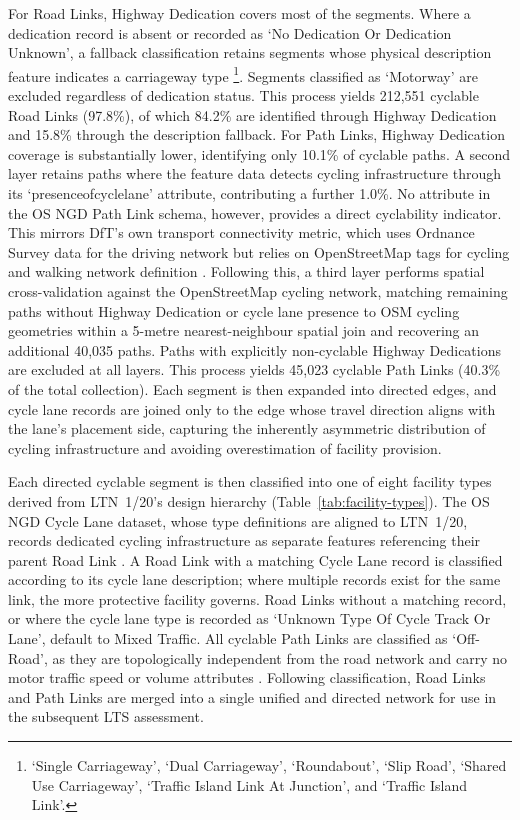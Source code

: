 For Road Links, Highway Dedication covers most of the segments. Where a dedication record is absent or recorded as `No Dedication Or Dedication Unknown', a fallback classification retains segments whose physical description feature indicates a carriageway type \footnote{`Single Carriageway', `Dual Carriageway', `Roundabout', `Slip Road', `Shared Use Carriageway', `Traffic Island Link At Junction', and `Traffic Island Link'.}. Segments classified as `Motorway' are excluded regardless of dedication status. This process yields 212,551 cyclable Road Links (97.8\%), of which 84.2\% are identified through Highway Dedication and 15.8\% through the description fallback. For Path Links, Highway Dedication coverage is substantially lower, identifying only 10.1\% of cyclable paths. A second layer retains paths where the feature data detects cycling infrastructure through its `presenceofcyclelane' attribute, contributing a further 1.0\%. No attribute in the OS NGD Path Link schema, however, provides a direct cyclability indicator. This mirrors DfT’s own transport connectivity metric, which uses Ordnance Survey data for the driving network but relies on OpenStreetMap tags for cycling and walking network definition \parencite{dft2025}. Following this, a third layer performs spatial cross-validation against the OpenStreetMap cycling network, matching remaining paths without Highway Dedication or cycle lane presence to OSM cycling geometries within a 5-metre nearest-neighbour spatial join and recovering an additional 40,035 paths. Paths with explicitly non-cyclable Highway Dedications are excluded at all layers. This process yields 45,023 cyclable Path Links (40.3\% of the total collection). Each segment is then expanded into directed edges, and cycle lane records are joined only to the edge whose travel direction aligns with the lane's placement side, capturing the inherently asymmetric distribution of cycling infrastructure and avoiding overestimation of facility provision.
 
Each directed cyclable segment is then classified into one of eight facility types derived from LTN~1/20's design hierarchy (Table~\ref{tab:facility-types}). The OS NGD Cycle Lane dataset, whose type definitions are aligned to LTN~1/20, records dedicated cycling infrastructure as separate features referencing their parent Road Link \parencite{ordnancesurvey2026c,ordnancesurvey2026d}. A Road Link with a matching Cycle Lane record is classified according to its cycle lane description; where multiple records exist for the same link, the more protective facility governs. Road Links without a matching record, or where the cycle lane type is recorded as `Unknown Type Of Cycle Track Or Lane', default to Mixed Traffic. All cyclable Path Links are classified as `Off-Road', as they are topologically independent from the road network and carry no motor traffic speed or volume attributes \parencite{ordnancesurvey2026b}. Following classification, Road Links and Path Links are merged into a single unified and directed network for use in the subsequent LTS assessment.
 
